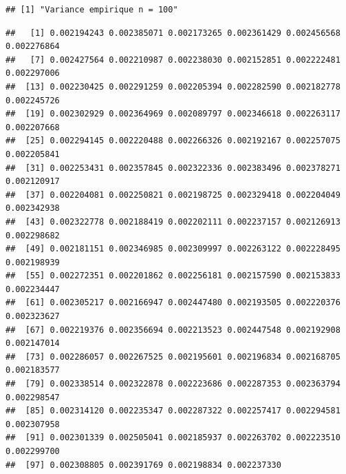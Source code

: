 \documentclass[
]{article}
\begin{document}
\begin{verbatim}
## [1] "Variance empirique n = 100"
\end{verbatim}

\begin{verbatim}
##   [1] 0.002194243 0.002385071 0.002173265 0.002361429 0.002456568 0.002276864
##   [7] 0.002427564 0.002210987 0.002238030 0.002152851 0.002222481 0.002297006
##  [13] 0.002230425 0.002291259 0.002205394 0.002282590 0.002182778 0.002245726
##  [19] 0.002302929 0.002364969 0.002089797 0.002346618 0.002263117 0.002207668
##  [25] 0.002294145 0.002220488 0.002266326 0.002192167 0.002257075 0.002205841
##  [31] 0.002253431 0.002357845 0.002322336 0.002383496 0.002378271 0.002120917
##  [37] 0.002204081 0.002250821 0.002198725 0.002329418 0.002204049 0.002342938
##  [43] 0.002322778 0.002188419 0.002202111 0.002237157 0.002126913 0.002298682
##  [49] 0.002181151 0.002346985 0.002309997 0.002263122 0.002228495 0.002198939
##  [55] 0.002272351 0.002201862 0.002256181 0.002157590 0.002153833 0.002234447
##  [61] 0.002305217 0.002166947 0.002447480 0.002193505 0.002220376 0.002323627
##  [67] 0.002219376 0.002356694 0.002213523 0.002447548 0.002192908 0.002147014
##  [73] 0.002286057 0.002267525 0.002195601 0.002196834 0.002168705 0.002183577
##  [79] 0.002338514 0.002322878 0.002223686 0.002287353 0.002363794 0.002298547
##  [85] 0.002314120 0.002235347 0.002287322 0.002257417 0.002294581 0.002307958
##  [91] 0.002301339 0.002505041 0.002185937 0.002263702 0.002223510 0.002299700
##  [97] 0.002308805 0.002391769 0.002198834 0.002237330
\end{verbatim}
\end{document}
